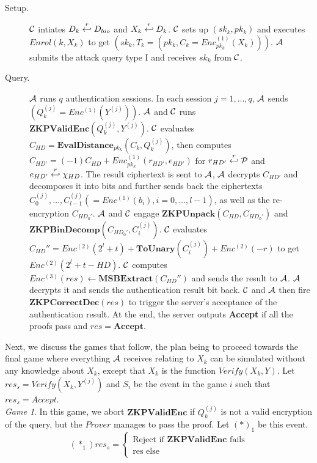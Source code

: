 \begin{description}
	\item [Setup.] $\mathcal{C}$ intiates $D_k \stackrel{r}{\hookleftarrow} D_{bio}$ and $X_k
	\stackrel{r}{\hookleftarrow} D_k$. $\mathcal{C}$ sets up $(sk_k, pk_k)$ and executes
	$Enrol(k, X_k)$ to get $(sk_k, T_k =(pk_k, C_k = Enc^{(1)}_{pk_k}(X_k)))$.
	$\mathcal{A}$ submits the attack query type I and receives $sk_k$ from
	$\mathcal{C}$.
	\item [Query.] $\mathcal{A}$ runs $q$ authentication sessions. In each session $j
	= 1, \dots, q$,
	$\mathcal{A}$ sends $(Q_k^{(j)} = Enc^{(1)}(Y^{(j)}))$. $\mathcal{A}$ and
	$\mathcal{C}$ runs $\mathbf{ZKPValidEnc}(Q_k^{(j)},Y^{(j)})$. $\mathcal{C}$ evaluates
	$C_{HD} = \mathbf{EvalDistance}_{pk_k}(C_k, Q_k^{(j)})$, then computes
	$C_{HD'} = (-1)C_{HD} + Enc_{pk_k}^{(1)}(r_{HD'},e_{HD'})$ for $r_{HD'}
	\stackrel{r}{\hookleftarrow} \mathcal{P}$ and $e_{HD'} \stackrel{r}{\hookleftarrow} \chi_{HD}$. The
	result ciphertext is sent to $\mathcal{A}$, $\mathcal{A}$ decrypts $C_{HD'}$
	and decomposes it into bits and further sends back the ciphertexts $C_0^{(j)}, \dots,
	C_{l-1}^{(j)} (= Enc^{(1)}(b_i), i = 0,\dots, l-1)$, as well as the
	re-encryption $C_{HD_0'}$. $\mathcal{A}$ and $\mathcal{C}$ engage
	$\mathbf{ZKPUnpack}(C_{HD},C_{HD_0'})$ and $\mathbf{ZKPBinDecomp}(C_{HD_0'},
	C_i^{(j)})$.
	$\mathcal{C}$ evaluates $C_{HD}'' = Enc^{(2)}(2^l + t) +
	\mathbf{ToUnary}(C_i^{(j)}) + Enc^{(2)}(-r) $ to get $Enc^{(2)}(2^l + t -
	HD)$. $\mathcal{C}$ computes $Enc^{(3)}(res) \gets
	\mathbf{MSBExtract}(C_{HD}'')$ and sends the result to $\mathcal{A}$. $\mathcal{A}$
	decrypts it and sends the authentication result bit back. $\mathcal{C}$ and
	$\mathcal{A}$ then fire $\mathbf{ZKPCorrectDec}(res)$ to trigger the server's acceptance of the
	authentication result. At the end, the server outputs \textbf{Accept} if
	all the proofs pass and $res = \mathbf{Accept}$.
\end{description}
Next, we discuss the games that follow, the plan being to proceed towards the final game where 
everything $\mathcal{A}$ receives relating to $X_k$ can be simulated
without any knowledge about $X_k$, except that $X_k$ is
the function $Verify(X_k, Y)$. Let $res_s = Verify(X_k, Y^{(j)})$ and $S_i$ be
the event in the game $i$ such that $res_s = Accept$.\\
\textit{Game 1}. In this game, we abort $\mathbf{ZKPValidEnc}$ if $Q_k^{(j)}$
is not a valid encryption of the query, but the $Prover$ manages to pass the
proof. Let $(*)_1$ be this event.
\[
(*_1)res_s = \begin{cases}
\text{Reject if } \mathbf{ZKPValidEnc} \text{ fails}\\
\text{res else}
\end{cases}
\]
